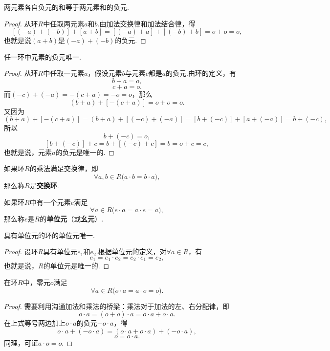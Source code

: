\begin{property}
两元素各自负元的和等于两元素和的负元.
\begin{proof}
从环\(R\)中任取两元素\(a\)和\(b\).由加法交换律和加法结合律，得\[
[(-a) + (-b)] + [a + b]
= [(-a) + a] + [(-b) + b]
= o + o = o,
\]也就是说\((a+b)\)是\((-a) + (-b)\)的负元.
\end{proof}
\end{property}

\begin{property}
任一环中元素的负元唯一.
\begin{proof}
从环\(R\)中任取一元素\(a\)，假设元素\(b\)与元素\(c\)都是\(a\)的负元.由环的定义，有\[
b + a = o,
\]\[
c + a = o.
\]而\((-c) + (-a) = -(c + a) = -o = o\)，那么\[
(b + a) + [-(c + a)]
= o + o = o.
\]又因为\[
(b + a) + [-(c + a)]
= (b + a) + [(-c) + (-a)]
= [b + (-c)] + [a + (-a)]
= b + (-c),
\]所以\[
b + (-c) = o,
\]\[
[b + (-c)] + c = b + [(-c) + c] = b = o + c = c,
\]也就是说，元素\(a\)的负元是唯一的.
\end{proof}
\end{property}

\begin{definition}
如果环\(R\)的乘法满足交换律，即\[
\forall a,b \in R \big( a \cdot b = b \cdot a \bigr),
\]那么称\(R\)是\textbf{交换环}.
\end{definition}

\begin{definition}
如果环\(R\)中有一个元素\(e\)满足\[
\forall a \in R \bigl( e \cdot a = a \cdot e = a \bigr),
\]那么称\(e\)是\(R\)的\textbf{单位元}（或\textbf{幺元}）.
\end{definition}

\begin{property}
具有单位元的环的单位元唯一.
\begin{proof}
设环\(R\)具有单位元\(e_1\)和\(e_2\).根据单位元的定义，对\(\forall a \in R\)，有\[
e_1 = e_1 \cdot e_2 = e_2 \cdot e_1 = e_2,
\]也就是说，\(R\)的单位元是唯一的.
\end{proof}
\end{property}

\begin{theorem}[乘零定理]
在环\(R\)中，零元\(o\)满足\[
\forall a \in R \bigl( o \cdot a = a \cdot o = o \bigr).
\]
\begin{proof}
需要利用沟通加法和乘法的桥梁：乘法对于加法的左、右分配律，即\[
o \cdot a = (o + o) \cdot a = o \cdot a + o \cdot a.
\]在上式等号两边加上\(o \cdot a\)的负元\(-o \cdot a\)，得\[
o \cdot a + (- o \cdot a) = (o \cdot a + o \cdot a) + (- o \cdot a),
\]\[
o = o \cdot a.
\]同理，可证\(a \cdot o = o\).
\end{proof}
\end{theorem}

